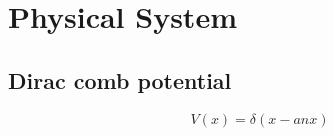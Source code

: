\chapter{Physical System}\label{ch:system}


\section{Dirac comb potential}

\begin{equation} %
	V(x) = \delta(x-anx)
\end{equation}






